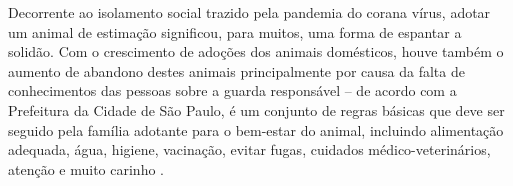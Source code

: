 Decorrente ao isolamento social trazido pela pandemia do corana vírus, adotar um animal de estimação significou, para muitos, uma forma de espantar a solidão. Com o crescimento de adoções dos animais domésticos, houve também o aumento de abandono destes animais principalmente por causa da falta de conhecimentos das pessoas sobre a guarda responsável  – de acordo com a Prefeitura da Cidade de São Paulo, é um conjunto de regras básicas que deve ser seguido pela família adotante para o bem-estar do animal, incluindo alimentação adequada,  água, higiene, vacinação, evitar fugas, cuidados médico-veterinários, atenção e muito carinho \cite{adocao_conscientequatro}.



